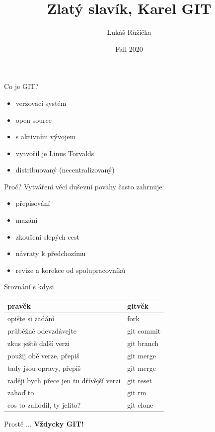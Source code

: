 \documentclass[14pt]{beamer}
\begin{document}
	\author{Lukáš Růžička}
	\title{Zlatý slavík, Karel GIT}
	\date{Fall 2020}
	\begin{frame}[plain]
		\maketitle
	\end{frame}


	\begin{frame}{Co je GIT?}
	\begin{itemize}
		\item verzovací systém
		\item open source
		\item s aktivním vývojem
		\item vytvořil je Linus Torvalds
		\item distribuovaný (necentralizovaný)
	\end{itemize}
	\end{frame}


	\begin{frame}{Proč?}
	 Vytváření věcí duševní povahy často zahrnuje:
		\vspace{5pt}
		
	\begin{itemize}
		\item přepisování
		\item mazání
		\item zkoušení slepých cest
		\item návraty k předchozímu
		\item revize a korekce od spolupracovníků
	\end{itemize}
\end{frame}
		
\begin{frame}{Srovnání s kdysi}
	
	\begin{tabular}{l|l}
		\textbf{pravěk} & \textbf{gitvěk} \\
		\hline opište si zadání &  fork \\
		průběžně odevzdávejte & git commit \\
		zkus ještě další verzi & git branch \\
		použij obě verze, přepiš  & git merge \\
		tady jsou opravy, přepiš & git merge \\
		raději bych přece jen tu dřívější verzi & git reset \\
		zahoď to & git rm \\
        cos to zahodil, ty jelito? & git clone
	\end{tabular}
	
	\vspace{10pt}
		
	Prostě $\ldots${} \textbf{Vždycky GIT!}

\end{frame}
\end{document}
